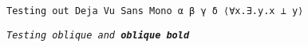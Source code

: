 \documentclass{article}
\begin{document}
\begin{verbatim}
Testing out Deja Vu Sans Mono α β γ δ ⟨∀x.∃.y.x ⊥ y⟩
\end{verbatim}

\textsl{\texttt{Testing oblique and \textbf{oblique bold}}}
\end{document}
